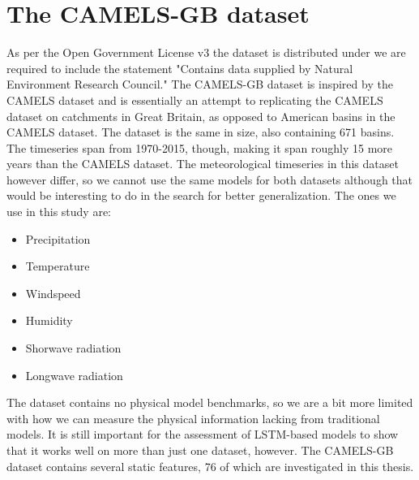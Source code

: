 \section{The CAMELS-GB dataset}
As per the Open Government License v3 the dataset is distributed under we are required 
to include the statement "Contains data supplied by Natural Environment Research Council."
The CAMELS-GB dataset \cite{CAMELS_GB} is inspired by the CAMELS dataset and is 
essentially an attempt to replicating the CAMELS dataset on catchments in Great Britain, 
as opposed to American basins in the CAMELS dataset. The dataset is the same in size,
also containing 671 basins. The timeseries span from 1970-2015, though, making 
it span roughly 15 more years than the CAMELS dataset.
 The meteorological timeseries 
in this dataset however differ, so we cannot use the same models for both datasets
although that would be interesting to do in the search for better generalization.
The ones we use in this study are:
\begin{itemize}
    \item Precipitation
    \item Temperature
    \item Windspeed
    \item Humidity
    \item Shorwave radiation
    \item Longwave radiation
\end{itemize}
The dataset contains no physical model benchmarks, so we are a bit more limited 
with how we can measure the physical information lacking from traditional models.
It is still important for the assessment of LSTM-based models to show that it works
well on more than just one dataset, however. 
The CAMELS-GB dataset contains several static features, 76 of which are investigated
in this thesis.
